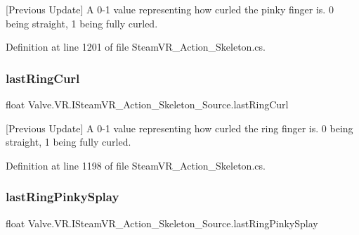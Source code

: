 \mbox{[}Previous Update\mbox{]} A 0-\/1 value representing how curled the pinky finger is. 0 being straight, 1 being fully curled. 



Definition at line 1201 of file Steam\+V\+R\+\_\+\+Action\+\_\+\+Skeleton.\+cs.

\mbox{\label{interface_valve_1_1_v_r_1_1_i_steam_v_r___action___skeleton___source_a7af26d481db15b493e1ab4180119e92c}} 
\subsubsection{\texorpdfstring{lastRingCurl}{lastRingCurl}}
{\footnotesize\ttfamily float Valve.\+V\+R.\+I\+Steam\+V\+R\+\_\+\+Action\+\_\+\+Skeleton\+\_\+\+Source.\+last\+Ring\+Curl\hspace{0.3cm}{\ttfamily [get]}}



\mbox{[}Previous Update\mbox{]} A 0-\/1 value representing how curled the ring finger is. 0 being straight, 1 being fully curled. 



Definition at line 1198 of file Steam\+V\+R\+\_\+\+Action\+\_\+\+Skeleton.\+cs.

\mbox{\label{interface_valve_1_1_v_r_1_1_i_steam_v_r___action___skeleton___source_a6bc4fdf659ba4ec2ea8613ecbb10abba}} 
\subsubsection{\texorpdfstring{lastRingPinkySplay}{lastRingPinkySplay}}
{\footnotesize\ttfamily float Valve.\+V\+R.\+I\+Steam\+V\+R\+\_\+\+Action\+\_\+\+Skeleton\+\_\+\+Source.\+last\+Ring\+Pinky\+Splay\hspace{0.3cm}{\ttfamily [get]}}



